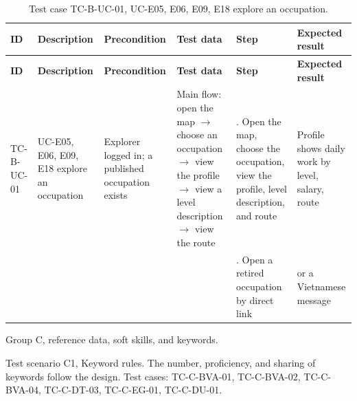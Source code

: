 {\footnotesize{}\renewcommand{\arraystretch}{1.1}
\begin{longtable}{|>{\raggedright\arraybackslash}p{}|>{\raggedright\arraybackslash}p{}|>{\raggedright\arraybackslash}p{}|>{\raggedright\arraybackslash}p{}|>{\raggedright\arraybackslash}p{}|>{\raggedright\arraybackslash}p{}|}
\caption{Test case TC-B-UC-01, UC-E05, E06, E09, E18 explore an occupation.} \\
\hline
\textbf{ID} & \textbf{Description} & \textbf{Precondition} & \textbf{Test data} & \textbf{Step} & \textbf{Expected result} \\ \hline
\endfirsthead
\hline
\textbf{ID} & \textbf{Description} & \textbf{Precondition} & \textbf{Test data} & \textbf{Step} & \textbf{Expected result} \\ \hline
\endhead
TC-B-UC-01 & UC-E05, E06, E09, E18 explore an occupation & Explorer logged in; a published occupation exists & Main flow: open the map $\rightarrow$ choose an occupation $\rightarrow$ view the profile $\rightarrow$ view a level description $\rightarrow$ view the route & 1. Open the map, choose the occupation, view the profile, level description, and route & Profile shows daily work by level, salary, route \\ \cline{5-6}
 &  &  &  & 2. Open a retired occupation by direct link & 404 or a Vietnamese message \\ \hline
\end{longtable}
}

Group C, reference data, soft skills, and keywords.

Test scenario C1, Keyword rules. The number, proficiency, and sharing of keywords follow the design. Test cases: TC-\allowbreak{}C-\allowbreak{}BVA-\allowbreak{}01, TC-\allowbreak{}C-\allowbreak{}BVA-\allowbreak{}02, TC-\allowbreak{}C-\allowbreak{}BVA-\allowbreak{}04, TC-C-DT-03, TC-C-EG-01, TC-C-DU-01.


